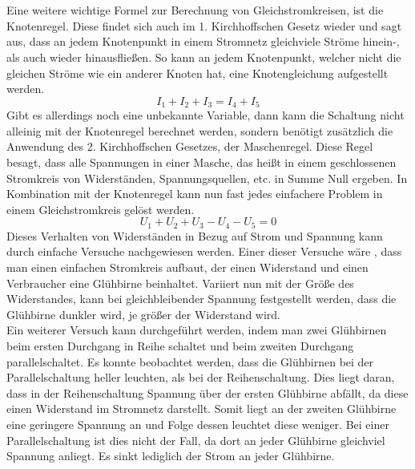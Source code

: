 \\\\
Eine weitere wichtige Formel zur Berechnung von Gleichstromkreisen, ist die Knotenregel. Diese findet sich auch im 1. Kirchhoffschen Gesetz wieder und sagt 
aus, dass an jedem Knotenpunkt in einem Stromnetz gleichviele Ströme hinein-, als auch wieder hinausfließen. So kann an jedem Knotenpunkt, welcher nicht 
die gleichen Ströme wie ein anderer Knoten hat, eine Knotengleichung aufgestellt werden. 
\begin{equation}
I_1+I_2+I_3=I_4+I_5
\label{eqn:1. Kirchhoffsches Gesetz}
\end{equation}
Gibt es allerdings noch eine unbekannte Variable, dann kann die Schaltung nicht alleinig mit der Knotenregel berechnet werden, sondern benötigt zusätzlich die 
Anwendung des 2. Kirchhoffschen Gesetzes, der Maschenregel. Diese Regel besagt, dass alle Spannungen in einer Masche, das heißt in einem geschlossenen Stromkreis 
von Widerständen, Spannungsquellen, etc. in Summe Null ergeben. In Kombination mit der Knotenregel kann nun fast jedes einfachere Problem in einem 
Gleichstromkreis gelöst werden.
\begin{equation}
U_1+U_2+U_3-U_4-U_5=0
\label{eqn:2. Kirchhoffsches Gesetz}
\end{equation}
Dieses Verhalten von Widerständen in Bezug auf Strom und Spannung kann durch einfache Versuche nachgewiesen werden. Einer dieser Versuche wäre \zB, dass 
man einen einfachen Stromkreis aufbaut, der einen Widerstand und einen Verbraucher \zB eine Glühbirne beinhaltet. Variiert nun mit der Größe des 
Widerstandes, kann bei gleichbleibender Spannung festgestellt werden, dass die Glühbirne dunkler wird, je größer der Widerstand wird.\\ 
Ein weiterer Versuch kann durchgeführt werden, indem man zwei Glühbirnen beim ersten Durchgang in Reihe schaltet und beim zweiten Durchgang 
parallelschaltet. Es konnte beobachtet werden, dass die Glühbirnen bei der Parallelschaltung heller leuchten, als bei der Reihenschaltung. Dies liegt daran, 
dass in der Reihenschaltung Spannung über der ersten Glühbirne abfällt, da diese einen Widerstand im Stromnetz darstellt. Somit liegt an der zweiten 
Glühbirne eine geringere Spannung an und Folge dessen leuchtet diese weniger. Bei einer Parallelschaltung ist dies nicht der Fall, da dort an jeder 
Glühbirne gleichviel Spannung anliegt. Es sinkt lediglich der Strom an jeder Glühbirne. \autocite{Weigerber.2018}
\\\\ 
